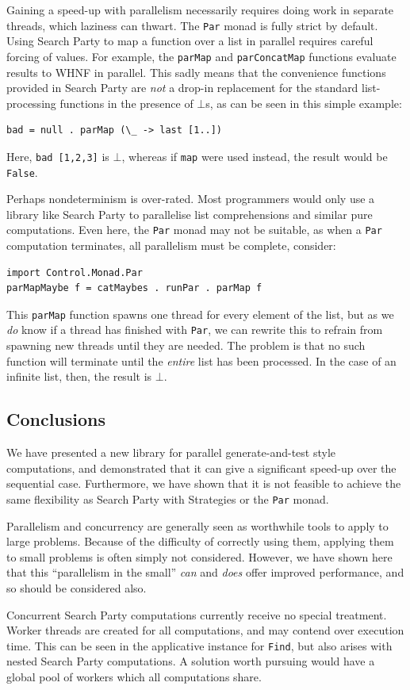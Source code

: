Gaining a speed-up with parallelism necessarily requires doing work in
separate threads, which laziness can thwart. The \verb|Par| monad is
fully strict by default. Using Search Party to map a function over a
list in parallel requires careful forcing of values. For example, the
\verb|parMap| and \verb|parConcatMap| functions evaluate results to
WHNF in parallel. This sadly means that the convenience functions
provided in Search Party are \textit{not} a drop-in replacement for
the standard list-processing functions in the presence of $\bot$s, as
can be seen in this simple example:

\begin{verbatim}
bad = null . parMap (\_ -> last [1..])
\end{verbatim}

Here, \verb|bad [1,2,3]| is $\bot$, whereas if \verb|map| were used
instead, the result would be \verb|False|.

Perhaps nondeterminism is over-rated. Most programmers would only use
a library like Search Party to parallelise list comprehensions and
similar pure computations. Even here, the \verb|Par| monad may not be
suitable, as when a \verb|Par| computation terminates, all parallelism
must be complete, consider:

\begin{verbatim}
import Control.Monad.Par
parMapMaybe f = catMaybes . runPar . parMap f
\end{verbatim}

This \verb|parMap| function spawns one thread for every element of the
list, but as we \textit{do} know if a thread has finished with
\verb|Par|, we can rewrite this to refrain from spawning new threads
until they are needed. The problem is that no such function will
terminate until the \textit{entire} list has been processed. In the
case of an infinite list, then, the result is $\bot$.

\subsection{Conclusions}
\label{sec:prelims-searchparty-concs}

We have presented a new library for parallel generate-and-test style
computations, and demonstrated that it can give a significant speed-up
over the sequential case. Furthermore, we have shown that it is not
feasible to achieve the same flexibility as Search Party with
Strategies or the \verb|Par| monad.

Parallelism and concurrency are generally seen as worthwhile tools to
apply to large problems. Because of the difficulty of correctly using
them, applying them to small problems is often simply not
considered. However, we have shown here that this ``parallelism in the
small'' \textit{can} and \textit{does} offer improved performance, and
so should be considered also.

Concurrent Search Party computations currently receive no special
treatment. Worker threads are created for all computations, and may
contend over execution time. This can be seen in the applicative
instance for \verb|Find|, but also arises with nested Search Party
computations. A solution worth pursuing would have a global pool of
workers which all computations share.
